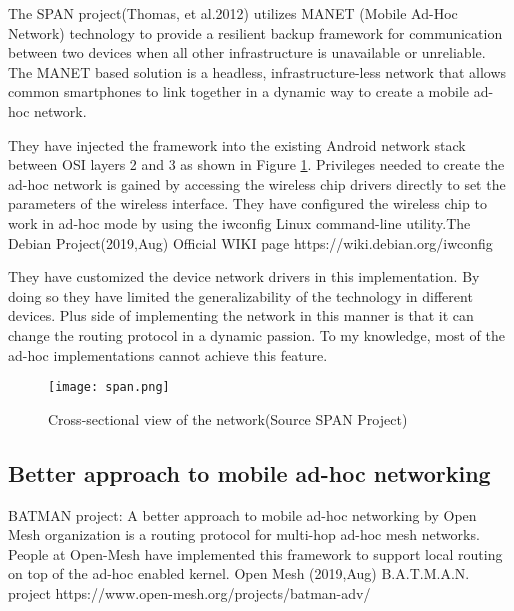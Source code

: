 \vspace{12pt}

The SPAN project(Thomas, et al.2012)\cite{defcon_paper} utilizes MANET (Mobile Ad-Hoc Network) technology to provide a resilient backup framework for communication between two devices when all other infrastructure is unavailable or unreliable. The MANET based solution is a headless, infrastructure-less network that allows common smartphones to link together in a dynamic way to create a mobile ad-hoc network.

\vspace{12pt}

They have injected the framework into the existing Android network stack between OSI layers 2 and 3 as shown in Figure \ref{fig:span}. Privileges needed to create the ad-hoc network is gained by accessing the wireless chip drivers directly to set the parameters of the wireless interface. They have configured the wireless chip to work in ad-hoc mode by using the iwconfig Linux command-line utility.The Debian Project(2019,Aug) Official WIKI page https://wiki.debian.org/iwconfig \cite{iwconfig}

\vspace{12pt}

They have customized the device network drivers in this implementation. By doing so they have limited the generalizability of the technology in different devices. Plus side of implementing the network in this manner is that it can change the routing protocol in a dynamic passion. To my knowledge, most of the ad-hoc implementations cannot achieve this feature.


\vspace{12pt}



\begin{figure}[H]
    \centering
   \texttt{[image: span.png]}
    \caption{Cross-sectional view of the network(Source SPAN Project\cite{defcon_paper})}
    \label{fig:span}
\end{figure}
\vspace{12pt}
\pagebreak

\subsection{Better approach to mobile ad-hoc networking}

\vspace{12pt}
BATMAN project: A better approach to mobile ad-hoc networking
\cite{BATMAN} by Open Mesh organization is a routing protocol for multi-hop ad-hoc mesh networks. People at Open-Mesh have implemented this framework to support local routing on top of the ad-hoc enabled kernel. Open Mesh (2019,Aug) B.A.T.M.A.N. project https://www.open-mesh.org/projects/batman-adv/

